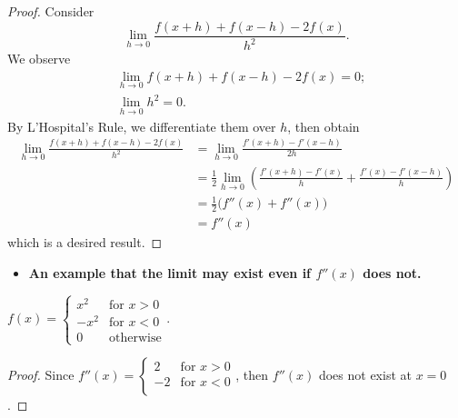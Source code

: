 \begin{Exercise}
	\begin{proof}
		Consider
		$$
		\lim_{h\to 0}\frac{f(x+h) + f(x-h) -2f(x)}{h^2}.
		$$
		We observe
		\begin{align*}
		&\lim_{h\to 0}f(x+h)+f(x-h)-2f(x) = 0; \\
		&\lim_{h\to 0}h^2 =0.
		\end{align*}
		By L'Hospital's Rule, we differentiate them over $h$, then obtain
		\begin{align*}
		\lim_{h\to 0}\frac{f(x+h) + f(x-h) -2f(x)}{h^2}
		&= \lim_{h\to 0}\frac{f'(x+h) - f'(x-h)}{2h} \\
		&= \frac{1}{2} \lim_{h\to 0}\left( \frac{f'(x+h)-f'(x)}{h} + \frac{f'(x) - f'(x-h)}{h} \right)\\
		&= \frac{1}{2} \big(f''(x) + f''(x) \big) \\
		&= f''(x)
		\end{align*}
		which is a desired result.
	\end{proof}
	\begin{itemize}
		\item \textbf{An example that the limit may exist even if $f''(x)$ does not.}
	\end{itemize}
	\begin{answer}
		$f(x) = \begin{cases}
		x^2 & \mbox{for } x > 0 \\
		-x^2 & \mbox{for } x < 0 \\
		0 & \mbox{otherwise}
		\end{cases}$.
	\end{answer}
	\begin{proof}
		Since $f''(x) = \begin{cases}
		2 & \mbox{for } x> 0 \\
		-2 & \mbox{for } x<0 \\
		\end{cases}$, then $f''(x)$ does not exist at $x=0$.
	\end{proof}
\end{Exercise}